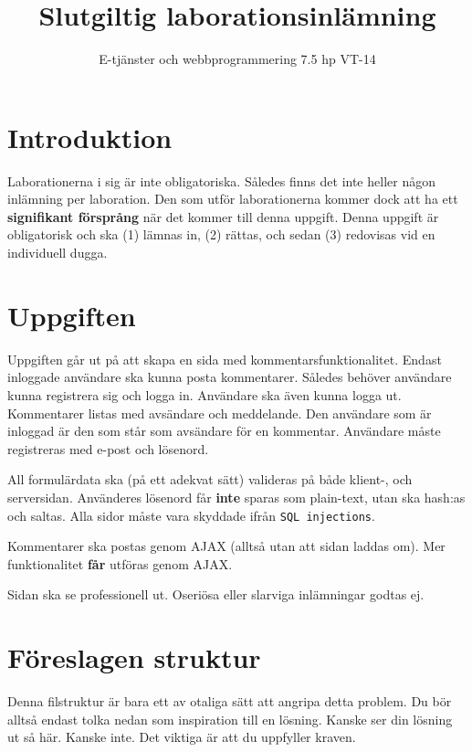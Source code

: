 \documentclass[12pt]{article}
\date{}
\title{ Slutgiltig laborationsinlämning }
\author{ E-tjänster och webbprogrammering 7.5 hp VT-14 }
\begin{document}
\maketitle
\vspace{-2em}



\section{Introduktion}
Laborationerna i sig är inte obligatoriska. Således finns det inte heller någon inlämning per laboration. Den som utför laborationerna kommer dock att ha ett \textbf{signifikant försprång} när det kommer till denna uppgift. Denna uppgift är obligatorisk och ska (1) lämnas in, (2) rättas, och sedan (3) redovisas vid en individuell dugga.

\section{Uppgiften}
Uppgiften går ut på att skapa en sida med kommentarsfunktionalitet. Endast inloggade användare ska kunna posta kommentarer. Således behöver användare kunna registrera sig och logga in. Användare ska även kunna logga ut. Kommentarer listas med avsändare och meddelande. Den användare som är inloggad är den som står som avsändare för en kommentar. Användare måste registreras med e-post och lösenord.

All formulärdata ska (på ett adekvat sätt) valideras på både klient-, och serversidan. Använderes lösenord får \textbf{inte} sparas som plain-text, utan ska hash:as och saltas. Alla sidor måste vara skyddade ifrån \texttt{SQL injections}.

Kommentarer ska postas genom AJAX (alltså utan att sidan laddas om). Mer funktionalitet \textbf{får} utföras genom AJAX.

Sidan ska se professionell ut. Oseriösa eller slarviga inlämningar godtas ej.







\pagebreak
\section{Föreslagen struktur}
Denna filstruktur är bara ett av otaliga sätt att angripa detta problem. Du bör alltså endast tolka nedan som inspiration till en lösning. Kanske ser din lösning ut så här. Kanske inte. Det viktiga är att du uppfyller kraven.
\end{document}
